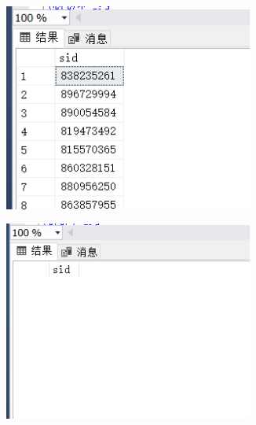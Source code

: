 \documentclass[a4paper,twoside]{article}
\begin{document}
\begin{spacing}{1.2}
\begin{enumerate}
\begin{figure}[h]
\centering
\caption{运行结果}
\begin{subfigure}{0.3\textwidth}
  \includegraphics[width=0.9\textwidth]{fig25.png}
\end{subfigure}
\begin{subfigure}{0.3\textwidth}
  \includegraphics[width=0.9\textwidth]{fig26.png}
\end{subfigure}
\end{figure}


\end{enumerate}
\end{spacing}
\end{document}

